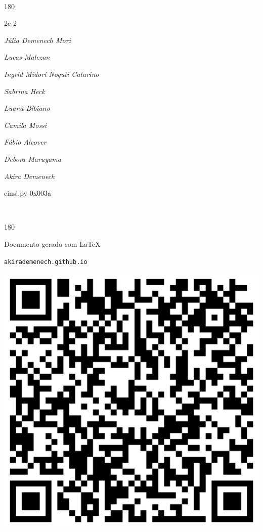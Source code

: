 \documentclass[12pt]{article}
\begin{document}
	\ 
	\vfill
	\begin{turn}{180}	
		\begin{minipage}{\textwidth}
		  	\ttfamily %
			\centering
			{\Huge 2e-2}
		  
			\hfill
		  
			

\textit{\small Júlia Demenech Mori}

\textit{\small Lucas Malezan}

\textit{\small Ingrid Midori Noguti Catarino}

\textit{\small Sabrina Heck}

\textit{\small Luana Bibiano}

\textit{\small Camila Mossi}

\textit{\small Fábio Alcover}

\textit{\small Debora Maruyama}

\textit{\small Akira Demenech}

\bigskip

eins!.py
0x003a


		\end{minipage}	
	\end{turn}
	\vfill
	\

\pagebreak

	\begin{turn}{180}	
		\begin{minipage}{\textwidth}		  
		  Documento gerado com \LaTeX			
		  
		  \texttt{akirademenech.github.io}

		  \includegraphics[height=0.3\textheight]{2e-2.pdf}

		\end{minipage}	
	\end{turn}  
		  
\end{document}
